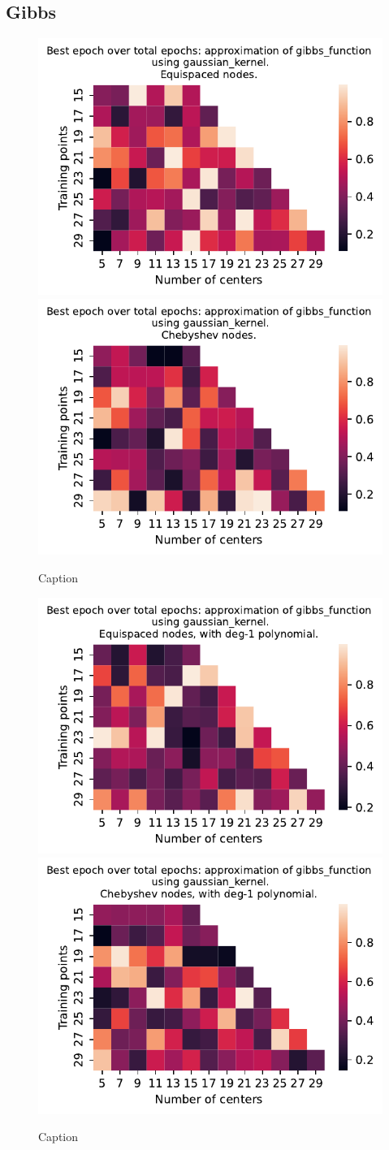 \documentclass[12pt]{report} %
\begin{document}
\subsection*{Gibbs}

\begin{figure}[ht]
    \centering
    
    \includegraphics[width=.49\textwidth]{imagenes/experiments/1d/variational_epochs/gibbs_function-Kgaussian_kernel-Equi-epochs.pdf}
    \includegraphics[width=.49\textwidth]{imagenes/experiments/1d/variational_epochs/gibbs_function-Kgaussian_kernel-Cheb-epochs.pdf}
    \caption{Caption}
    \label{fig:epochs-gibbs-gaussian}
\end{figure}



\begin{figure}[ht]
    \centering
    
    \includegraphics[width=.49\textwidth]{imagenes/experiments/1d/variational_epochs/gibbs_function-Kgaussian_kernel-Poly-Equi-epochs.pdf}
    \includegraphics[width=.49\textwidth]{imagenes/experiments/1d/variational_epochs/gibbs_function-Kgaussian_kernel-Poly-Cheb-epochs.pdf}
    \caption{Caption}
    \label{fig:epochs-gibbs-gaussian-poly}
\end{figure}
\end{document}
